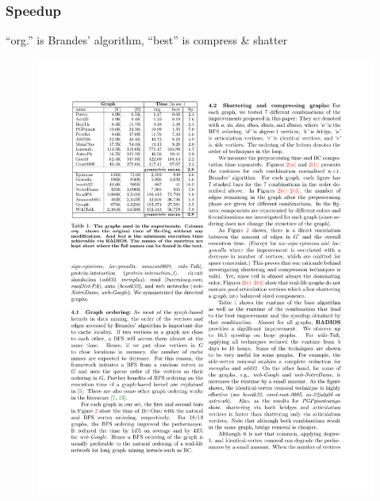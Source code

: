 \begin{frame}
  \frametitle{Speedup}
  ``org.'' is Brandes' algorithm, ``best'' is compress \& shatter
  \begin{figure}
    \includegraphics{imgs/runtimebadios.pdf}
  \end{figure}
\end{frame}


